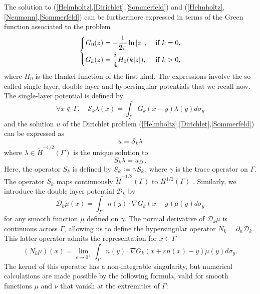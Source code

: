 \documentclass[a4paper]{article}
\begin{document}
The solution to (\ref{Helmholtz},\ref{Dirichlet},\ref{Sommerfeld}) and (\ref{Helmholtz},\ref{Neumann},\ref{Sommerfeld}) can be furthermore expressed in 
terms of the Green function associated to the problem
\begin{equation}
	\left\{
	\begin{aligned}
		G_0(z) &= -\dfrac{1}{2\pi} \ln \left\lvert z \right\rvert, && \text{ if } k= 0,\\
		G_k(z) &= \frac{i}{4}H_0(k|z|), && \text{ if } k > 0,
	\end{aligned} 
	\right.
\end{equation} 
where $H_0$ is the Hankel function of the first kind. The expressions involve the so-called single-layer, double-layer and hypersingular potentials that we 
recall now. The single-layer potential is defined by
\begin{equation}
	\forall x \notin \Gamma,  \quad \mathcal{S}_k\lambda(x) = \int_{\Gamma}G_k(x-y)\lambda(y)d\sigma_y
	\label{defSk}
\end{equation}
and the solution $u$ of the Dirichlet problem (\ref{Helmholtz},\ref{Dirichlet},\ref{Sommerfeld}) can be expressed 
as
\begin{equation}
	u = \mathcal{S}_k \lambda
\end{equation}
where $\lambda \in \tilde{H}^{-1/2}(\Gamma)$ is the unique solution to 
\begin{equation}
	S_k \lambda = u_D\,.
	\label{Sklambda}
\end{equation}
Here, the operator $S_k$ is defined by $S_k \mathrel{\mathop:}= \gamma \mathcal{S}_k$, where $\gamma$ is the trace operator on $\Gamma$. The operator $S_k$ maps continuously 
$\tilde{H}^{-1/2}(\Gamma)$ to $H^{1/2}(\Gamma)$ \cite[Theorem 1.8]{wendland1990hypersingular}. 
Similarly, we introduce the double layer potential $\mathcal{D}_k$ by 
\[\mathcal{D}_k \mu(x) = \int_{\Gamma} n(y) \cdot \nabla G_k(x-y) \mu(y) d\sigma_y\]
for any smooth function $\mu$ defined on $\gamma$.
The normal derivative of $\mathcal{D}_k\mu$ is continuous across $\Gamma$, allowing us to define the hypersingular operator $N_k = \partial_n \mathcal{D}_k$. 
This latter operator admits the representation for $x\in \Gamma$
\begin{equation}
	(N_k \mu) (x) = \lim_{\varepsilon \to 0^+} \int_{\Gamma} n(y) \cdot \nabla G_k(x + \varepsilon n(x) - y) \mu(y) d\sigma_y.
	\label{defNk}
\end{equation}
The kernel of this operator has a non-integrable singularity, but numerical calculations are made possible by the following formula, valid for smooth functions 
$\mu$ and $\nu$ that vanish at the extremities of $\Gamma$: 
\end{document}
